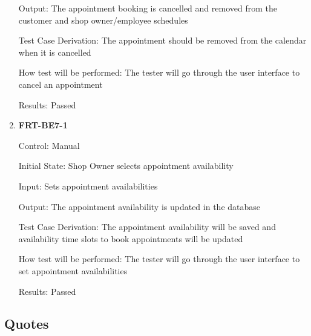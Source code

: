 \documentclass[12pt, titlepage]{article}
\begin{document}
\begin{enumerate}
	      Output: The appointment booking is cancelled and removed from the customer and shop owner/employee
	      schedules

	      Test Case Derivation: The appointment should be removed from the calendar when it is cancelled

	      How test will be performed: The tester will go through the user interface to cancel an appointment

	      Results: Passed

	\item \textbf{FRT-BE7-1}

	      Control: Manual

	      Initial State: Shop Owner selects appointment availability

	      Input: Sets appointment availabilities

	      Output: The appointment availability is updated in the database

	      Test Case Derivation: The appointment availability will be saved and availability time slots to
	      book appointments will be updated

	      How test will be performed: The tester will go through the user interface to set appointment
	      availabilities

	      Results: Passed

\end{enumerate}

\subsection{Quotes}
\end{document}
